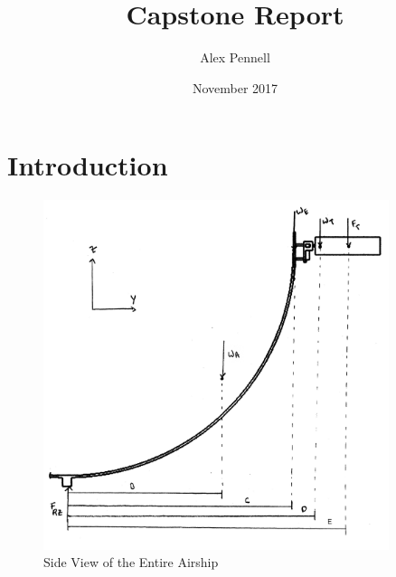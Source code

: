 \documentclass[12pt]{article}
\title{Capstone Report}
\author{Alex Pennell}
\date{November 2017}
\begin{document}
\maketitle

\section{Introduction}

\begin{figure}
	\centering
	\includegraphics[width=0.9\textwidth]{ArmThrustDonwards.png}
	\caption{Side View of the Entire Airship}
	\label{fig:FullBlimp}
\end{figure}
\end{document}
